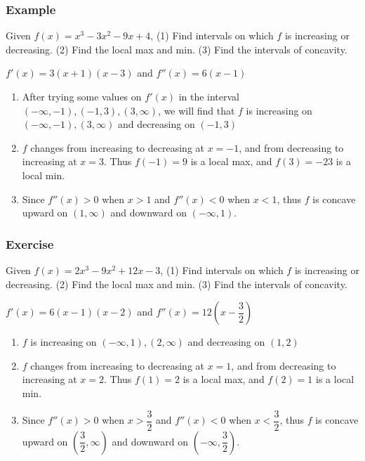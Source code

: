 \documentclass[t]{beamer}
\theoremstyle{plain}
\theoremstyle{definition}
\begin{document}
\begin{frame}
\frametitle{Example}

Given $f(x) = x^3 - 3x^2 - 9x + 4$,  (1) Find intervals on which $f$ is increasing or decreasing.  (2) Find the local max and min.  (3) Find the intervals of concavity. \pause

\vspace{1em}

$f'(x) = 3(x + 1)(x-3)$ and $f''(x) = 6(x-1)$

\begin{enumerate}
		\item After trying some values on $f'(x)$ in the interval $(-\infty, -1), (-1, 3), (3, \infty)$, we will find that $f$ is increasing on $(-\infty, -1), (3, \infty)$ and decreasing on $(-1, 3)$
		\item $f$ changes from increasing to decreasing at $x=-1$, and from decreasing to increasing at $x=3$.  Thus $f(-1) = 9$ is a local max, and $f(3) = -23$ is a local min.
		\item Since $f''(x) > 0$ when $x >1$ and $f''(x) < 0$ when $x < 1$, thus $f$ is concave upward on $(1, \infty)$ and downward on $(-\infty, 1)$.
\end{enumerate}

\end{frame}

\begin{frame}

\frametitle{Exercise}

Given $f(x) = 2x^3 - 9x^2 +12x -3$,  (1) Find intervals on which $f$ is increasing or decreasing.  (2) Find the local max and min.  (3) Find the intervals of concavity.\pause

$f'(x) = 6(x - 1)(x - 2)$ and $f''(x) = 12(x-\dfrac{3}{2})$

\begin{enumerate}
		\item $f$ is increasing on $(-\infty, 1), (2, \infty)$ and decreasing on $(1, 2)$
		\item $f$ changes from increasing to decreasing at $x=1$, and from decreasing to increasing at $x=2$.  Thus $f(1) = 2$ is a local max, and $f(2) = 1$ is a local min.
		\item Since $f''(x) > 0$ when $x >\dfrac{3}{2}$ and $f''(x) < 0$ when $x < \dfrac{3}{2}$, thus $f$ is concave upward on $(\dfrac{3}{2}, \infty)$ and downward on $(-\infty, \dfrac{3}{2})$.
\end{enumerate}

\end{frame}
\end{document}
